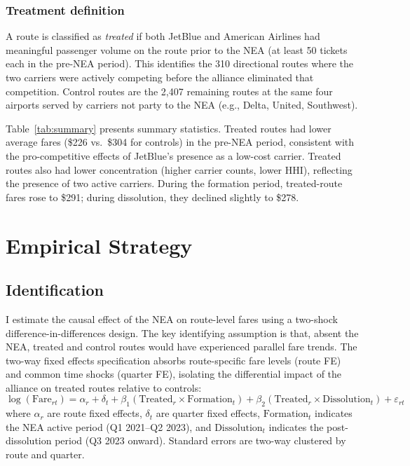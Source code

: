 \documentclass[12pt]{article}
\begin{document}
\subsubsection*{Treatment definition} A route is classified as \textit{treated} if both JetBlue and American Airlines had meaningful passenger volume on the route prior to the NEA (at least 50 tickets each in the pre-NEA period). This identifies the 310 directional routes where the two carriers were actively competing before the alliance eliminated that competition. Control routes are the 2,407 remaining routes at the same four airports served by carriers not party to the NEA (e.g., Delta, United, Southwest).



Table~\ref{tab:summary} presents summary statistics. Treated routes had lower average fares (\$226 vs.\ \$304 for controls) in the pre-NEA period, consistent with the pro-competitive effects of JetBlue's presence as a low-cost carrier. Treated routes also had lower concentration (higher carrier counts, lower HHI), reflecting the presence of two active carriers. During the formation period, treated-route fares rose to \$291; during dissolution, they declined slightly to \$278.


\section{Empirical Strategy}

\subsection{Identification}

I estimate the causal effect of the NEA on route-level fares using a two-shock difference-in-differences design. The key identifying assumption is that, absent the NEA, treated and control routes would have experienced parallel fare trends. The two-way fixed effects specification absorbs route-specific fare levels (route FE) and common time shocks (quarter FE), isolating the differential impact of the alliance on treated routes relative to controls:
\begin{equation}
\log(\text{Fare}_{rt}) = \alpha_r + \delta_t + \beta_1 (\text{Treated}_r \times \text{Formation}_t) + \beta_2 (\text{Treated}_r \times \text{Dissolution}_t) + \varepsilon_{rt}
\label{eq:main}
\end{equation}
where $\alpha_r$ are route fixed effects, $\delta_t$ are quarter fixed effects, $\text{Formation}_t$ indicates the NEA active period (Q1 2021--Q2 2023), and $\text{Dissolution}_t$ indicates the post-dissolution period (Q3 2023 onward). Standard errors are two-way clustered by route and quarter.
\end{document}
